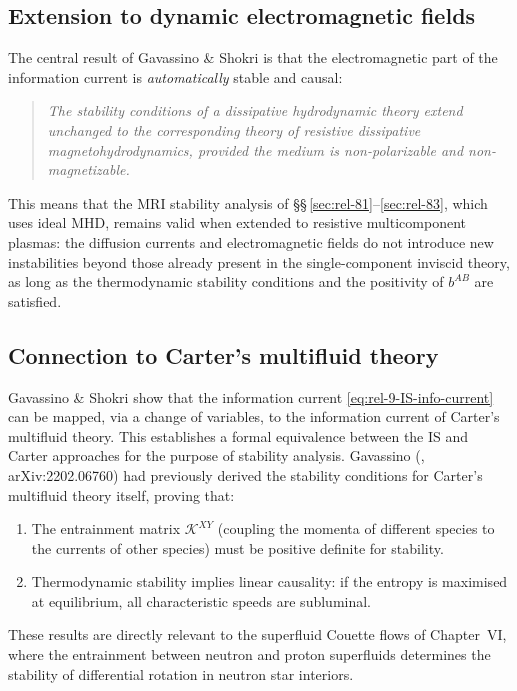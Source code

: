 \subsection{Extension to dynamic electromagnetic fields}

The central result of Gavassino \& Shokri is that the electromagnetic
part of the information current is \emph{automatically} stable and causal:
\begin{quote}
\textit{The stability conditions of a dissipative hydrodynamic theory
extend unchanged to the corresponding theory of resistive dissipative
magnetohydrodynamics, provided the medium is non-polarizable and
non-magnetizable.}
\end{quote}
This means that the MRI stability analysis of
\S\S\,\ref{sec:rel-81}--\ref{sec:rel-83}, which uses ideal MHD, remains
valid when extended to resistive multicomponent plasmas: the diffusion
currents and electromagnetic fields do not introduce new instabilities
beyond those already present in the single-component inviscid theory,
as long as the thermodynamic stability conditions and the positivity of
$b^{AB}$ are satisfied.

\subsection{Connection to Carter's multifluid theory}

Gavassino \& Shokri show that the information current
\eqref{eq:rel-9-IS-info-current} can be mapped, via a change of
variables, to the information current of Carter's multifluid theory.
This establishes a formal equivalence between the IS and Carter approaches
for the purpose of stability analysis.  Gavassino (\citealt{GavassinoCarter2022},
arXiv:2202.06760) had previously derived the stability conditions for
Carter's multifluid theory itself, proving that:
\begin{enumerate}
\item The entrainment matrix $\mathcal{K}^{XY}$ (coupling the momenta
  of different species to the currents of other species) must be
  positive definite for stability.
\item Thermodynamic stability implies linear causality: if the entropy
  is maximised at equilibrium, all characteristic speeds are subluminal.
\end{enumerate}
These results are directly relevant to the superfluid Couette flows
of Chapter~VI, where the entrainment between neutron and proton
superfluids determines the stability of differential rotation in
neutron star interiors.
